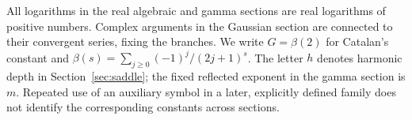 All logarithms in the real algebraic and gamma sections are real
logarithms of positive numbers. Complex arguments in the Gaussian
section are connected to their convergent series, fixing the branches.
We write $G=\beta(2)$ for Catalan's constant and
$\beta(s)=\sum_{j\geq0}(-1)^j/(2j+1)^s$. The letter $h$ denotes
harmonic depth in Section~\ref{sec:saddle}; the fixed reflected exponent
in the gamma section is $m$. Repeated use of an auxiliary symbol in a
later, explicitly defined family does not identify the corresponding
constants across sections.
